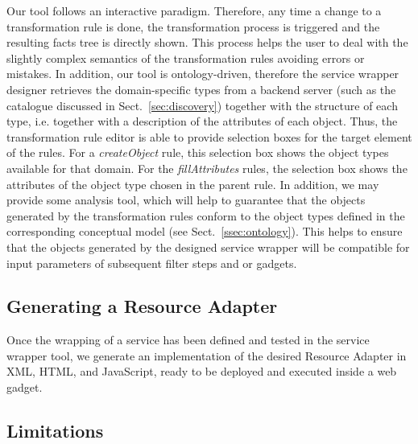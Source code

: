 Our tool follows an interactive paradigm. Therefore, any time a change to a transformation rule is done, the transformation process is triggered and the resulting facts tree is directly shown. This process helps the user to deal with the slightly complex semantics of the transformation rules avoiding errors or mistakes. In addition, our tool is ontology-driven, therefore the service wrapper designer retrieves the domain-specific types from a backend server (such as the catalogue discussed in Sect.~\ref{sec:discovery}) together with the structure of each type, i.e. together with a description of the attributes of each object. Thus, the transformation rule editor is able to provide selection boxes for the target element of the rules. For a \emph{createObject} rule, this selection box shows the object types available for that domain. For the \emph{fillAttributes} rules, the selection box shows the attributes of the object type chosen in the parent rule. In addition, we may provide some analysis tool, which will help to guarantee that the objects generated by the transformation rules conform to the object types defined in the corresponding conceptual model (see Sect.~\ref{ssec:ontology}). This helps to ensure that the objects generated by the designed service wrapper will be compatible for input parameters of subsequent filter steps and or gadgets.



\subsection{Generating a Resource Adapter} %
\label{sub:generating_a_resource_adapter}

Once the wrapping of a service has been defined and tested in the service wrapper tool, we generate an implementation of the desired Resource Adapter in XML, HTML, and JavaScript, ready to be deployed and executed inside a web gadget. 


\subsection{Limitations} %
\label{sub:limitations}

